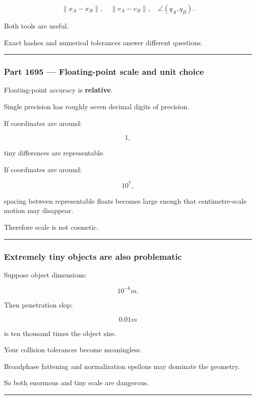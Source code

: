\[
\|x_A-x_B\|,
\quad
\|v_A-v_B\|,
\quad
\angle(q_A,q_B).
\]

Both tools are useful.

Exact hashes and numerical tolerances answer different questions.

\begin{center}\rule{0.5\linewidth}{0.5pt}\end{center}

\subsubsection{Part 1695 --- Floating-point scale and unit choice}\label{part-1695-floating-point-scale-and-unit-choice}

Floating-point accuracy is \textbf{relative}.

Single precision has roughly seven decimal digits of precision.

If coordinates are around:

\[
1,
\]

tiny differences are representable.

If coordinates are around:

\[
10^7,
\]

spacing between representable floats becomes large enough that centimetre-scale motion may disappear.

Therefore scale is not cosmetic.

\begin{center}\rule{0.5\linewidth}{0.5pt}\end{center}

\subsubsection{Extremely tiny objects are also problematic}\label{extremely-tiny-objects-are-also-problematic}

Suppose object dimensions:

\[
10^{-6}m.
\]

Then penetration slop:

\[
0.01m
\]

is ten thousand times the object size.

Your collision tolerances become meaningless.

Broadphase fattening and normalization epsilons may dominate the geometry.

So both enormous and tiny scale are dangerous.

\begin{center}\rule{0.5\linewidth}{0.5pt}\end{center}

